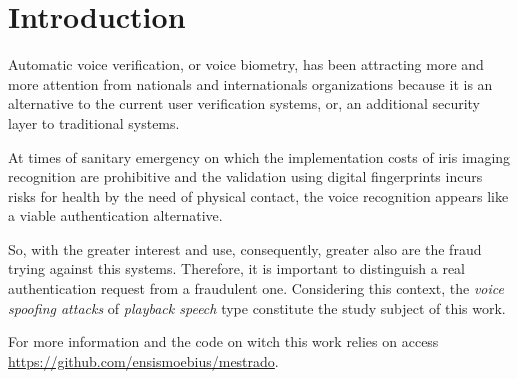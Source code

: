 \vspace*{+5pt}
\section{Introduction}
\label{introduction}
		\par Automatic voice verification, or voice biometry, has been attracting more and more attention from nationals and internationals organizations because it is an alternative to the current user verification systems, or, an additional security layer to  traditional systems.
		
		\par At times of sanitary emergency on which the implementation costs of iris imaging recognition are prohibitive and the validation using digital fingerprints incurs risks for health by the need of physical contact, the voice recognition appears like a viable authentication alternative.
				
		\par So, with the greater interest and use, consequently, greater also are the fraud trying against this systems. Therefore, it is important to distinguish a real authentication request from a fraudulent one. Considering this context, the \textit{voice spoofing attacks} of \textit{playback speech} type constitute the study subject of this work.
		
 		\par For more information and the code on witch this work relies on access \href{https://github.com/ensismoebius/mestrado}{https://github.com/ensismoebius/mestrado}.